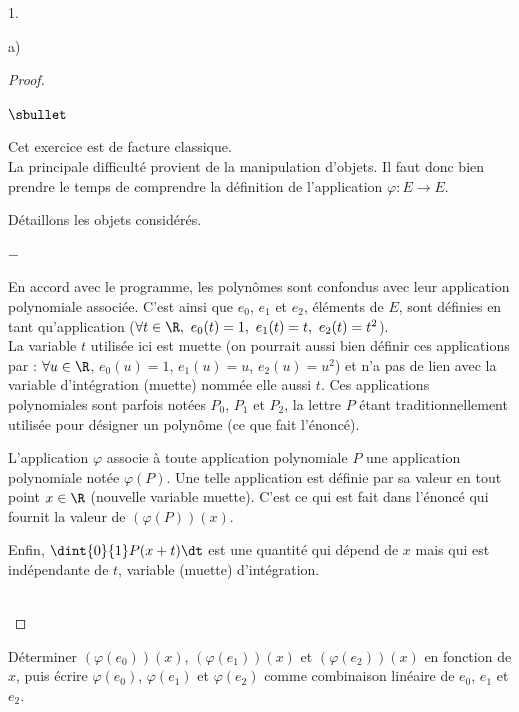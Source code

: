 \documentclass[11pt]{article}%
\begin{document}
\begin{noliste}{1.}
\begin{noliste}{a)}
\begin{proof}
      
      \begin{remark}%
        \begin{noliste}{$\sbullet$}
        \item Cet exercice est de facture classique.\\
          La principale difficulté provient de la manipulation
          d'objets. Il faut donc bien prendre le temps de comprendre
          la définition de l'application $\varphi : E \to E$.
        \item Détaillons les objets considérés.
          \begin{noliste}{$-$}
          \item En accord avec le programme, les polynômes sont
            confondus avec leur application polynomiale
            associée. C'est ainsi que $e_0$, $e_1$ et $e_2$, éléments
            de $E$, sont définies en tant qu'application ($\forall t
            \in \R, \ e_{0}(t) = 1, \ e_{1}(t) = t, \ e_{2}(t) =
            t^{2}$).\\
            La variable $t$ utilisée ici est muette (on pourrait aussi
            bien définir ces applications par : $\forall u \in \R$,
            $e_0(u) = 1$, $e_{1}(u) = u$, $e_2(u) = u^2$) et n'a pas
            de lien avec la variable d'intégration (muette) nommée
            elle aussi $t$. Ces applications polynomiales sont parfois
            notées $P_0$, $P_1$ et $P_2$, la lettre $P$ étant
            traditionnellement utilisée pour désigner un polynôme (ce
            que fait l'énoncé).
          \item L'application $\varphi$ associe à toute application
            polynomiale $P$ une application polynomiale notée
            $\varphi(P)$. Une telle application est définie par sa
            valeur en tout point $x \in \R$ (nouvelle variable
            muette). C'est ce qui est fait dans l'énoncé qui fournit
            la valeur de $(\varphi(P))(x)$.
          \item Enfin, $\dint{0}{1} P(x+t) \dt$ est une quantité qui
            dépend de $x$ mais qui est indépendante de $t$, variable
            (muette) d'intégration.
          \end{noliste}
        \end{noliste}
      \end{remark}~\\[-1.2cm]
    \end{proof}
    
  \item Déterminer $\left(\varphi(e_{0})\right)(x)$,
    $\left(\varphi(e_{1})\right)(x)$ et
    $\left(\varphi(e_{2})\right)(x)$ en fonction de $x$, puis écrire
    $\varphi(e_{0})$, $\varphi(e_{1})$ et $\varphi(e_{2})$ comme
    combinaison linéaire de $e_{0}$, $e_{1}$ et $e_{2}$.


\end{noliste}
\end{noliste}
\end{document}
